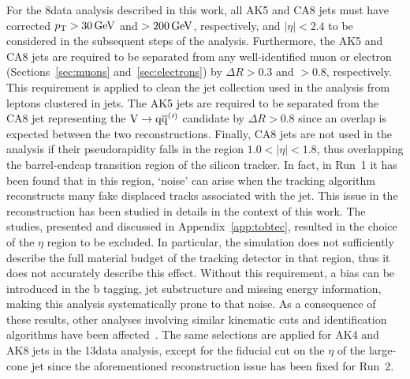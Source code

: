 For the 8\TeV data analysis described in this work, all AK5 and CA8 jets must have corrected $p_{\mathrm{T}} > 30\,\text{Ge\hspace{-.08em}V}$ and $> 200\,\text{Ge\hspace{-.08em}V}$, respectively, and $|\eta| < 2.4$ to be considered in the subsequent steps of the analysis.
Furthermore, the AK5 and CA8 jets are required to be separated from any well-identified muon or electron (Sections~\ref{sec:muons} and~\ref{sec:electrons}) by $\Delta R > 0.3$ and $> 0.8$, respectively. This requirement is applied to clean the jet collection used in the analysis from leptons clustered in jets. The AK5 jets are required to be separated from the CA8 jet representing the $\mathrm{V}\to\mathrm{q}\overline{\mathrm{q}}^({}'^){}$ candidate by $\Delta R > 0.8$ since an overlap is expected between the two reconstructions. Finally, CA8 jets are not used in the analysis if their pseudorapidity falls in the region $1.0 < |\eta| < 1.8$, thus overlapping the barrel-endcap transition region of the silicon tracker.
In fact, in Run~1 it has been found that in this region, `noise' can arise when the tracking algorithm reconstructs many fake displaced tracks associated with the jet.
This issue in the reconstruction has been studied in details in the context of this work. The studies, presented and discussed in Appendix~\ref{app:tobtec}, resulted in the choice of the $\eta$ region to be excluded.
In particular, the simulation does not sufficiently describe the full material budget of the tracking detector in that region, thus it does not accurately describe this effect.
Without this requirement, a bias can be introduced in the b tagging, jet substructure and missing energy information, making this analysis systematically prone to that noise.
As a consequence of these results, other analyses involving similar kinematic cuts and identification algorithms have been affected~\cite{CMS-PAS-EXO-15-008}.
The same selections are applied for AK4 and AK8 jets in the 13\TeV data analysis, except for the fiducial cut on the $\eta$ of the large-cone jet since the aforementioned reconstruction issue has been fixed for Run~2.
